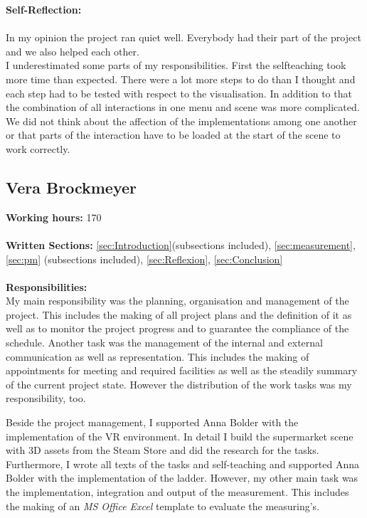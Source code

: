 \textbf{Self-Reflection:}\\ \\
In my opinion the project ran quiet well. Everybody had their part of the project and we also helped each other.\\
I underestimated some parts of my responsibilities. First the selfteaching took more time than expected. There were a lot more steps to do than I thought and each step had to be tested with respect to the visualisation. In addition to that the combination of all interactions in one menu and scene was more complicated. We did not think about the affection of the implementations among one another or that parts of the interaction have to be loaded at the start of the scene to work correctly.\\

\newpage

\newpage
\subsection{Vera Brockmeyer} \label{sec:SAVera}

\textbf{Working hours:} 170 \\ \\
\textbf{Written Sections: }\ref{sec:Introduction}(subsections included),  \ref{sec:measurement}, \ref{sec:pm} (subsections included), \ref{sec:Reflexion}, \ref{sec:Conclusion} \\ \\
\textbf{Responsibilities:}\\ 
My main responsibility was the planning, organisation and management of the project. This includes the making of all project plans and the definition of it as well as to monitor the project progress and to guarantee the compliance of the schedule. Another task was the management of the internal and external communication as well as representation. This includes the making of appointments for meeting and required facilities as well as the steadily summary of the current project state. However the distribution of the work tasks was my responsibility, too.

Beside the project management, I supported Anna Bolder with the implementation of the VR environment. In detail I build the supermarket scene with 3D assets from the Steam Store and did the research for the tasks. Furthermore, I wrote all texts of the tasks and self-teaching and supported Anna Bolder with the implementation of the ladder. However, my other main task was the implementation, integration and output of the measurement. This includes the making of an \textit{MS Office Excel} template to evaluate the measuring's.


